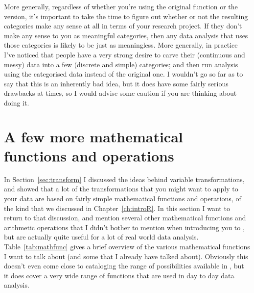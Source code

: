 More generally, regardless of whether you're using the original  function or the  version, it's important to take the time to figure out whether or not the resulting categories make any sense at all in terms of your research project. If they don't make any sense to you as meaningful categories, then any data analysis that uses those categories is likely to be just as meaningless. More generally, in practice I've noticed that people have a very strong desire to carve their (continuous and messy) data into a few (discrete and simple) categories; and then run analysis using the categorised data instead of the original one. I wouldn't go so far as to say that this is an inherently bad idea, but it does have some fairly serious drawbacks at times, so I would advise some caution if you are thinking about doing it. 




\section{A few more mathematical functions and operations~\label{sec:mathfunc}}

In Section~\ref{sec:transform} I discussed the ideas behind variable transformations, and showed that a lot of the transformations that you might want to apply to your data are based on fairly simple mathematical functions and operations, of the kind that we discussed in Chapter~\ref{ch:introR}. In this section I want to return to that discussion, and mention several other mathematical functions and arithmetic operations that I didn't bother to mention when introducing you to \R, but are actually quite useful for a lot of real world data analysis. Table~\ref{tab:mathfunc} gives a brief overview of the various mathematical functions I want to talk about (and some that I already have talked about). Obviously this doesn't even come close to cataloging the range of possibilities available in \R, but it does cover a very wide range of functions that are used in day to day data analysis.



